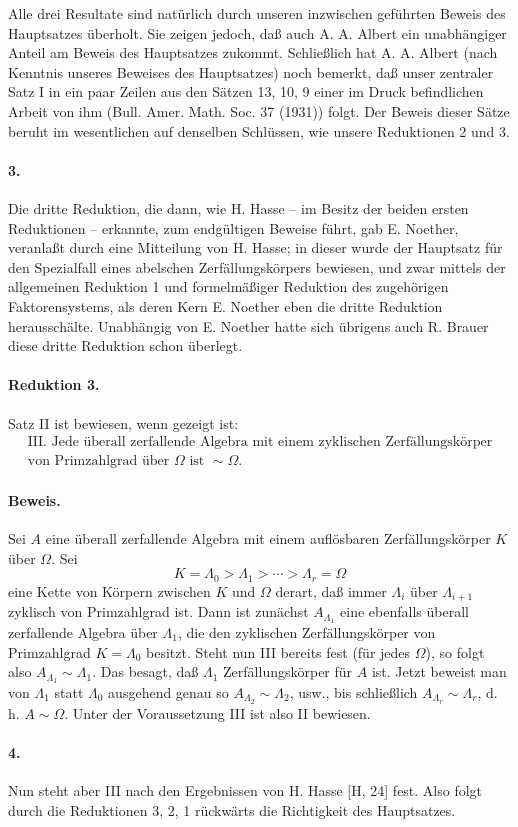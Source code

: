 {Alle drei Resultate sind natürlich durch unseren inzwischen geführten Beweis des Hauptsatzes überholt. Sie zeigen jedoch, daß auch A. A. Albert ein unabhängiger Anteil am Beweis des Hauptsatzes zukommt. Schließlich hat A. A. Albert (nach Kenntnis unseres Beweises des Hauptsatzes) noch bemerkt, daß unser zentraler Satz I in ein paar Zeilen aus den Sätzen 13, 10, 9 einer im Druck befindlichen Arbeit von ihm (Bull. Amer. Math. Soc. 37 (1931)) folgt. Der Beweis dieser Sätze beruht im wesentlichen auf denselben Schlüssen, wie unsere Reduktionen 2 und 3.}

\paragraph{3.}
Die dritte Reduktion, die dann, wie H. Hasse -- im Besitz der beiden ersten Reduktionen -- erkannte, zum endgültigen Beweise führt, gab E. Noether, veranlaßt durch eine Mitteilung von H. Hasse; in dieser wurde der Hauptsatz für den Spezialfall eines abelschen Zerfällungskörpers bewiesen, und zwar mittels der allgemeinen Reduktion 1 und formelmäßiger Reduktion des zugehörigen Faktorensystems, als deren Kern E. Noether eben die dritte Reduktion herausschälte. Unabhängig von E. Noether hatte sich übrigens auch R. Brauer diese dritte Reduktion schon überlegt.

\paragraph{Reduktion 3.}
Satz II ist bewiesen, wenn gezeigt ist:
\[
\begin{gathered}\text{III. Jede überall zerfallende Algebra mit einem zyklischen Zerfällungskörper}\\\text{von Primzahlgrad über }\Omega\text{ ist }\sim\Omega .\end{gathered}
\]

\paragraph{Beweis.}
Sei \(A\) eine überall zerfallende Algebra mit einem auflösbaren Zerfällungskörper \(K\) über \(\Omega\). Sei
\[
K=\Lambda_0>\Lambda_1>\cdots>\Lambda_r=\Omega
\]
eine Kette von Körpern zwischen \(K\) und \(\Omega\) derart, daß immer \(\Lambda_i\) über \(\Lambda_{i+1}\) zyklisch von Primzahlgrad ist. Dann ist zunächst \(A_{\Lambda_1}\) eine ebenfalls überall zerfallende Algebra über \(\Lambda_1\), die den zyklischen Zerfällungskörper von Primzahlgrad \(K=\Lambda_0\) besitzt. Steht nun III bereits fest (für jedes \(\Omega\)), so folgt also \(A_{\Lambda_1}\sim \Lambda_1\). Das besagt, daß \(\Lambda_1\) Zerfällungskörper für \(A\) ist. Jetzt beweist man von \(\Lambda_1\) statt \(\Lambda_0\) ausgehend genau so \(A_{\Lambda_2}\sim\Lambda_2\), usw., bis schließlich \(A_{\Lambda_r}\sim\Lambda_r\), d. h. \(A\sim\Omega\). Unter der Voraussetzung III ist also II bewiesen.

\paragraph{4.}
Nun steht aber III nach den Ergebnissen von H. Hasse [H, 24] fest. Also folgt durch die Reduktionen 3, 2, 1 rückwärts die Richtigkeit des Hauptsatzes.
